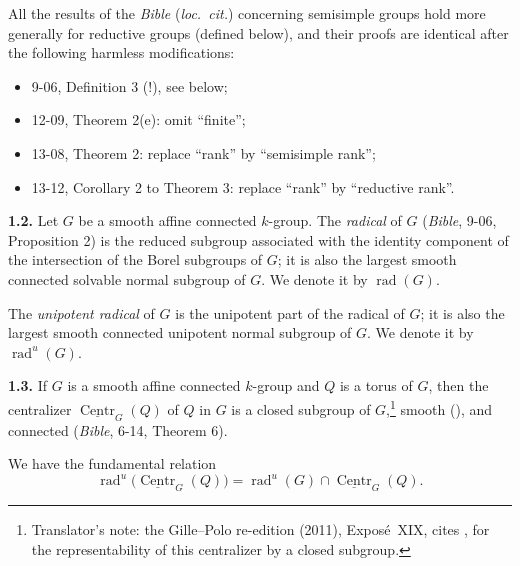 
All the results of the \emph{Bible} (\emph{loc.\ cit.}) concerning semisimple
groups hold more generally for reductive groups (defined below), and their
proofs are identical after the following harmless modifications:
\begin{itemize}
\item 9-06, Definition 3 (!), see below;
\item 12-09, Theorem 2(e): omit ``finite'';
\item 13-08, Theorem 2: replace ``rank'' by ``semisimple rank'';
\item 13-12, Corollary 2 to Theorem 3: replace ``rank'' by
  ``reductive rank''.
\end{itemize}

\noindent{}\textbf{1.2.}\quad
Let \(G\) be a smooth affine connected \(k\)-group.  The \emph{radical} of
\(G\) (\emph{Bible}, 9-06, Proposition 2)
is the reduced subgroup associated with the identity component of the
intersection of the Borel subgroups of \(G\); it is also the largest smooth
connected solvable normal subgroup of \(G\).  We denote it by
\(\operatorname{rad}(G)\).

The \emph{unipotent radical} of \(G\) is the unipotent part of the radical of
\(G\); it is also the largest smooth connected unipotent normal subgroup of
\(G\).  We denote it by \(\operatorname{rad}^{u}(G)\).

\noindent{}\textbf{1.3.}\quad
If \(G\) is a smooth affine connected \(k\)-group and \(Q\) is a torus
of \(G\), then the centralizer
\(\underline{\operatorname{Centr}}_{G}(Q)\) of \(Q\) in \(G\) is a closed
subgroup of \(G\),\footnote{Translator's note: the Gille--Polo re-edition (2011), Exposé~XIX, cites
, for the representability of this centralizer by a
closed subgroup.} smooth (), and connected
(\emph{Bible}, 6-14, Theorem 6).

We have the fundamental relation
\[
  \operatorname{rad}^{u}\!\bigl(\underline{\operatorname{Centr}}_{G}(Q)\bigr)
  =
  \operatorname{rad}^{u}(G)\cap
  \underline{\operatorname{Centr}}_{G}(Q).
\]

